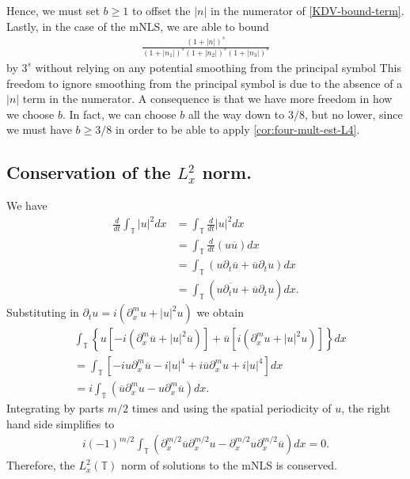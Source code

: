 \documentclass[12pt,reqno]{amsart}
\numberwithin{equation}{section}  %
\numberwithin{figure}{section}
\newcommand{\ci}{\mathbb{T}}
\newcommand{\p}{\partial}
\newcommand{\quod}{\qquad \qedsymbol}
\theoremstyle{plain}
\theoremstyle{definition}
\theoremstyle{remark}
\begin{document}
Hence, we must set $b \ge 1$ to offset the $|n|$ in the numerator of 
\eqref{KDV-bound-term}.
Lastly, in the case of the mNLS, we are able to bound 
\begin{equation*}
	\begin{split}
		\frac{\left (1 + |n| \right ) ^s}{\left (1 + |n_1| \right ) ^s \left (1 + |n_2| \right ) ^s \left (1 + |n_3| \right ) ^s} 
	\end{split}
\end{equation*}
by $3^s$ without relying on any potential smoothing from the principal symbol
This freedom to ignore smoothing from the principal symbol is due to the
absence of a $|n|$ term in the
numerator. A consequence is that we have more freedom in how
we choose $b$. In fact, we can choose $b$ all the way down to $3/8$, but no
lower, since we must have $b \ge 3/8$ in order to be able to apply
\autoref{cor:four-mult-est-L4}. 
%
%
\subsection{Conservation of the $L_x^2$ norm.} 
We have
%
%
\begin{equation*}
	\begin{split}
		\frac{d}{dt} \int_\ci | u |^2  dx
		& = \int_\ci \frac{d}{dt} | u |^2  dx
		\\
		& = \int_\ci \frac{d}{dt} \left( u \overline{u} \right)  dx
		\\
		& = \int_\ci \left( u \p_t \overline{u} + \overline{u} \p_t u \right) dx
		\\
		& = \int_\ci \left( u \overline{\p_t u} + \overline{u} \p_t u \right)dx.
	\end{split}
\end{equation*}
%
%
Substituting in $\p_t u = i\left( \p_x^{m} u + | u |^2 u \right)$ we obtain
%
%
\begin{equation*}
	\begin{split}
		& \int_{\ci} \left\{ u\left[ -i\left( \p_x^{m} \overline{u} + | u |^2
		\overline{u} \right) \right] + \overline{u}\left[ i\left( \p_x^{m} u + | u
		|^2 u \right) \right] \right\}dx
		\\
		& = \int_\ci \left[ -iu \p_x^{m} \overline{u} - i| u |^4 + i \overline{u}
		\p_x^{m} u + i | u |^4 \right]dx
		\\
		& = i \int_{\ci}\left( \overline{u} \p_x^{m} u - u \p_x^{m } \overline{u}
		\right)dx.
	\end{split}
\end{equation*}
%
%
Integrating by parts $m/2$ times and using
the spatial periodicity of $u$, the right
hand side simplifies to
%
%
\begin{equation*}
	\begin{split}
    i (-1)^{m/2}\int_\ci \left( \p_x^{m/2} \overline{u} \p_x^{m/2} u - \p_x^{m/2} u
		\p_x^{m/2 } 
		\overline{u} \right) dx = 0.
	\end{split}
\end{equation*}
%
%
Therefore, the $L_x^2(\ci)$ norm of solutions to the mNLS is conserved. \quod
\end{document}
